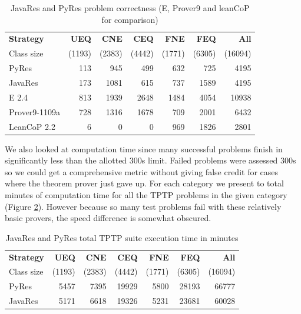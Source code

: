 \documentclass{llncs}
\begin{document}
\begin{table}[tbh]
  \begin{tabular}{lrrrrrr}
    \hline
    \textbf{Strategy} & \multicolumn{1}{p{4em}}{\hfill{}\textbf{UEQ}}
    & \multicolumn{1}{p{4em}}{\hfill{}\textbf{CNE}}& \multicolumn{1}{p{4em}}{\hfill{}\textbf{CEQ}}
    & \multicolumn{1}{p{4em}}{\hfill{}\textbf{FNE}}& \multicolumn{1}{p{4em}}{\hfill{}\textbf{FEQ}}
    & \multicolumn{1}{p{4em}}{\hfill{}\textbf{All}}\\
    {\tiny Class size} & {\tiny (1193)} & {\tiny (2383)} & {\tiny (4442)} & {\tiny (1771)} & {\tiny (6305)} & {\tiny (16094)}\\
    \hline
    PyRes              &   113 &  945 &   499 &   632 &   725 &  4195 \\
    JavaRes            &   173 & 1081 &   615 &   737 &  1589 &  4195 \\
    \hline
    E 2.4              &   813 &  1939 &  2648 &  1484 &  4054 & 10938 \\
    Prover9-1109a      &   728 &  1316 &  1678 &   709 &  2001 &  6432 \\
    LeanCoP 2.2        &     6 &     0 &     0 &   969 &  1826 &  2801 \\
    \hline
  \end{tabular}
  \caption{JavaRes and PyRes problem correctness (E, Prover9 and leanCoP for comparison)}
  \label{tab:res}
\end{table}

We also looked at computation time since many successful problems finish in significantly less than the allotted
300s limit.  Failed problems were assessed 300s so we could get a comprehensive metric without giving false credit
for cases where the theorem prover just gave up.  For each category we present to total minutes of computation time for all
the TPTP problems in the given category (Figure \ref{tab:res2}). However because so many test problems fail with these
relatively basic provers, the speed difference is somewhat obscured.

\begin{table}[tbh]
  \begin{tabular}{lrrrrrr}
    \hline
    \textbf{Strategy} & \multicolumn{1}{p{4em}}{\hfill{}\textbf{UEQ}}
    & \multicolumn{1}{p{4em}}{\hfill{}\textbf{CNE}}& \multicolumn{1}{p{4em}}{\hfill{}\textbf{CEQ}}
    & \multicolumn{1}{p{4em}}{\hfill{}\textbf{FNE}}& \multicolumn{1}{p{4em}}{\hfill{}\textbf{FEQ}}
    & \multicolumn{1}{p{4em}}{\hfill{}\textbf{All}}\\
    {\tiny Class size} & {\tiny (1193)} & {\tiny (2383)} & {\tiny (4442)} & {\tiny (1771)} & {\tiny (6305)} & {\tiny (16094)}\\
    \hline
    PyRes              &   5457 &  7395 &   19929 &   5800 &   28193 &  66777 \\
    JavaRes            &   5171 &  6618 &   19326 &   5231 &   23681 &  60028 \\
    \hline
  \end{tabular}
  \caption{JavaRes and PyRes total TPTP suite execution time in minutes}
  \label{tab:res2}
\end{table}
\end{document}

